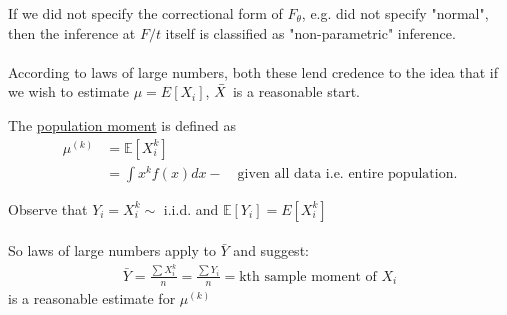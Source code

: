 If we did not specify the correctional form of $F_\theta$, e.g. did not specify "normal", then the inference at $F/t$ itself is classified as "non-parametric" inference.\\\\
According to laws of large numbers, both these lend credence to the idea that if we wish to estimate $\mu = E[X_i]$, $\bar{X}$ is a reasonable start.
\begin{definition}
	The \underline{population moment} is defined as
	\begin{align*}
		\mu^{(k)} & = \mathbb{E}[X_i^k]\\
		& = \int x^k f(x) dx - \quad \text{given all data i.e. entire population.}
	\end{align*}
\end{definition}
Observe that $Y_i = X_i^k \sim $ i.i.d. and $\mathbb{E}[Y_i] = E[X_i^k]$\\\\
So laws of large numbers apply to $\bar{Y}$ and suggest:
\begin{gather*}
	\bar{Y} = \frac{\sum X_i^k}{n} = \frac{\sum Y_i}{n} = \text{kth sample moment of } X_i
\end{gather*}
is a reasonable estimate for $\mu^{(k)}$
